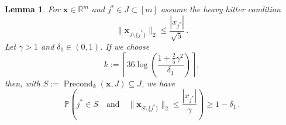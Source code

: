 \documentclass[12pt]{article}
\theoremstyle{plain}
\newtheorem{lemma}[theorem]{Lemma}
\theoremstyle{definition}
\renewcommand{\P}{{\mathbb P}}
\renewcommand{\vec}{\boldsymbol}
\newcommand{\R}{{\mathbb R}}
\DeclareMathOperator{\precond}{Precond}
\begin{document}
\begin{lemma} \label{lem:precond}
    For $\vec{x} \in \R^m$ and $j^\ast \in J \subset [m]$ assume the heavy hitter condition
    \begin{equation*} \label{eq:weakHHC}
        \|\vec{x}_{J \setminus\{j^\ast\}}\|_2
            \leq \frac{|x_{j^\ast}|}{\sqrt{5}} \,.
    \end{equation*}
    Let $\gamma > 1$ and $\delta_1 \in (0,1)$.
    If we choose
    \begin{equation*}
        k := \left\lceil 36 \log\left(\frac{1+\frac{2}{5}\gamma^2}{\delta_1}\right)\right\rceil ,
    \end{equation*}
    then, with $S := \precond_{k}(\vec{x},J) \subseteq J$, we have
    \begin{equation*}
        \P\left( j^\ast \in S \quad \text{and} \quad
            \|\vec{x}_{S \setminus\{j^\ast\}}\|_2 \leq \frac{|x_{j^\ast}|}{\gamma}
            \right)
            \geq 1-\delta_1 \,.
    \end{equation*}
\end{lemma}
\end{document}
